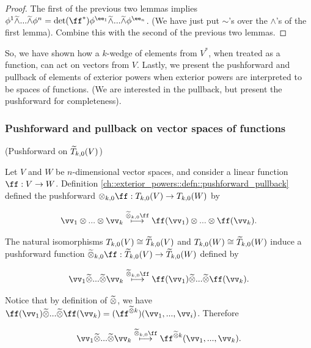 \begin{proof}
   The first of the previous two lemmas implies $\phi^1 \twedge ... \twedge \phi^n = \det(\ff^*) \phi^{\ee_1} \twedge ... \twedge \phi^{\ee_n}$. (We have just put $\sim$'s over the $\wedge$'s of the first lemma). Combine this with the second of the previous two lemmas.
\end{proof}

So, we have shown how a $k$-wedge of elements from $V^*$, when treated as a function, can act on vectors from $V$. Lastly, we present the pushforward and pullback of elements of exterior powers when exterior powers are interpreted to be spaces of functions. (We are interested in the pullback, but present the pushforward for completeness).

\subsubsection{Pushforward and pullback on vector spaces of functions}

\begin{deriv}
    (Pushforward on $\widetilde{T}_{k,0}(V)$)
    
    Let $V$ and $W$ be $n$-dimensional vector spaces, and consider a linear function $\ff:V \rightarrow W$. Definition \ref{ch::exterior_powers::defn::pushforward_pullback} defined the pushforward $\otimes_{k, 0} \ff: T_{k,0}(V) \rightarrow T_{k,0}(W)$ by
    
    \begin{align*}
        \vv_1 \otimes ... \otimes \vv_k \overset{\totimes_{k,0} \ff}{\longmapsto} \ff(\vv_1) \otimes ... \otimes \ff(\vv_k).
    \end{align*}
    
    The natural isomorphisms $T_{k,0}(V) \cong \widetilde{T}_{k,0}(V)$ and $T_{k,0}(W) \cong \widetilde{T}_{k,0}(W)$ induce a pushforward function ${\totimes_{k,0} \ff:\tT_{k,0}(V) \rightarrow \tT_{k,0}(W)}$ defined by
    
    \begin{align*}
        \vv_1 \totimes ... \totimes \vv_k \overset{\totimes_{k,0} \ff}{\longmapsto} \ff(\vv_1) \totimes ... \totimes \ff(\vv_k).
    \end{align*}
    
    Notice that by definition of $\widetilde{\otimes}$, we have $ \ff(\vv_1) \totimes ... \totimes \ff(\vv_k) = (\ff^{\totimes k})(\vv_1, ..., \vv_i)$. Therefore
    
    \begin{align*}
        \vv_1 \totimes ... \totimes \vv_k \overset{\totimes_{k,0} \ff}{\longmapsto} \ff^{\totimes k}(\vv_1, ..., \vv_k).
    \end{align*}
\end{deriv}

